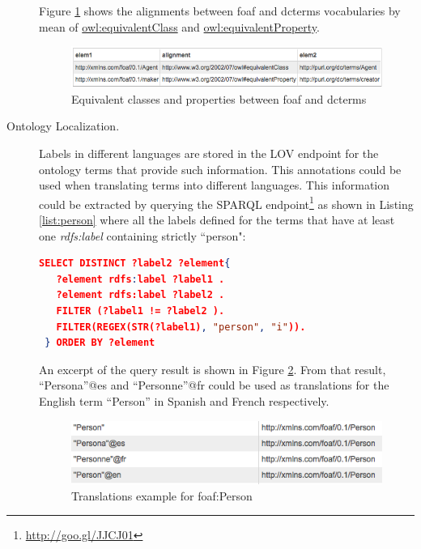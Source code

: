 \documentclass{iosart2c}
\begin{document}
\begin{description}
\begin{lstlisting}[basicstyle=\tiny,float=htb,caption={SPARQL query asking for all the equivalent classes and properties between the vocabularies foaf and dcterms. },label=list:alignment, language=json]
	\end{lstlisting}
	
	Figure \ref{fig:eqCR} shows the alignments between foaf and dcterms vocabularies by mean of \url{owl:equivalentClass} and \url{owl:equivalentProperty}.
    \begin{figure}
      \centering
      \includegraphics[width=1.0\linewidth]{equivalentCandR.png}
      \caption{Equivalent classes and properties between foaf and dcterms}
      \label{fig:eqCR}
    \end{figure}
    
 \item [Ontology Localization.] Labels in different languages are stored in the LOV endpoint for the ontology terms that provide such information. This annotations could be used when translating terms into different languages. This information could be extracted by querying the SPARQL endpoint\footnote{\url{http://goo.gl/JJCJ01}} as shown in Listing \ref{list:person} where all the labels defined for the terms that have at least one \emph{rdfs:label} containing strictly ``person":
		
    \begin{lstlisting}[basicstyle=\tiny,float=htb,caption={SPARQL query asking all the labels defined for the terms containing person.},label=list:person, language=json]
 SELECT DISTINCT ?label2 ?element{
   ?element rdfs:label ?label1 .
   ?element rdfs:label ?label2 .
   FILTER (?label1 != ?label2 ).
   FILTER(REGEX(STR(?label1), "person", "i")).
 } ORDER BY ?element
	\end{lstlisting}
							
   An excerpt of the query result is shown in Figure \ref{fig:translations}. From that result, ``Persona''@es and ``Personne''@fr could be used as translations for the English term ``Person'' in Spanish and French respectively. 
   
   \begin{figure}[ht!b]
     \centering
     \includegraphics[width=.90\linewidth]{translations1.png}
     \caption{Translations example for foaf:Person}
     \label{fig:translations}
   \end{figure}
   
\end{description}
\end{document}
